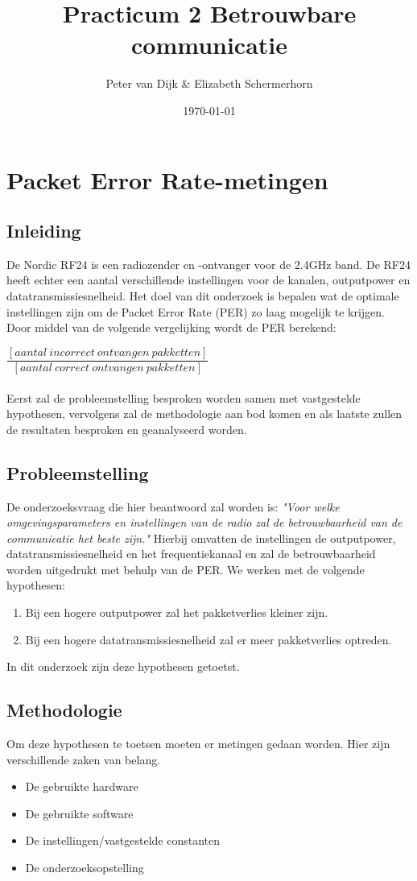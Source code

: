 \documentclass{article}
\author{Peter van Dijk \& Elizabeth Schermerhorn}
\date{\today}
\title{Practicum 2 Betrouwbare communicatie}
\begin{document}
\maketitle
\newpage
\tableofcontents
\clearpage
\section{Packet Error Rate-metingen}
\label{PER}
\subsection{Inleiding}
De Nordic RF24 is een radiozender en -ontvanger voor de 2.4GHz band. De RF24 heeft echter een aantal verschillende instellingen voor de kanalen, outputpower en datatransmissiesnelheid. Het doel van dit onderzoek is bepalen wat de optimale instellingen zijn om de Packet Error Rate (PER) zo laag mogelijk te krijgen. Door middel van de volgende vergelijking wordt de PER berekend: 
\setlength{\parskip}{10pt plus 1pt minus 1pt}

$\dfrac {[aantal\ incorrect\ ontvangen\ pakketten]}{[aantal\ correct\ ontvangen\ pakketten]}$\\
\\
Eerst zal de probleemstelling besproken worden samen met vastgestelde hypothesen, vervolgens zal de methodologie aan bod komen en als laatste zullen de resultaten besproken en geanalyseerd worden. 

\subsection{Probleemstelling}
De onderzoeksvraag die hier beantwoord zal worden is: \textit{"Voor welke omgevingsparameters en instellingen van de radio zal de betrouwbaarheid van de communicatie het beste zijn."} Hierbij omvatten de instellingen de outputpower, datatransmissiesnelheid en het frequentiekanaal en zal de betrouwbaarheid worden uitgedrukt met behulp van de PER. We werken met de volgende hypothesen: 
\begin{enumerate}
  \item Bij een hogere outputpower zal het pakketverlies kleiner zijn.
  \item Bij een hogere datatransmissiesnelheid zal er meer pakketverlies optreden. 
\end{enumerate}
In dit onderzoek zijn deze hypothesen getoetst.

\subsection{Methodologie}
Om deze hypothesen te toetsen moeten er metingen gedaan worden. Hier zijn verschillende zaken van belang. 
\begin{itemize}
	\item De gebruikte hardware
	\item De gebruikte software
	\item De instellingen/vastgestelde constanten
	\item De onderzoeksopstelling
\end{itemize}
\end{document}
